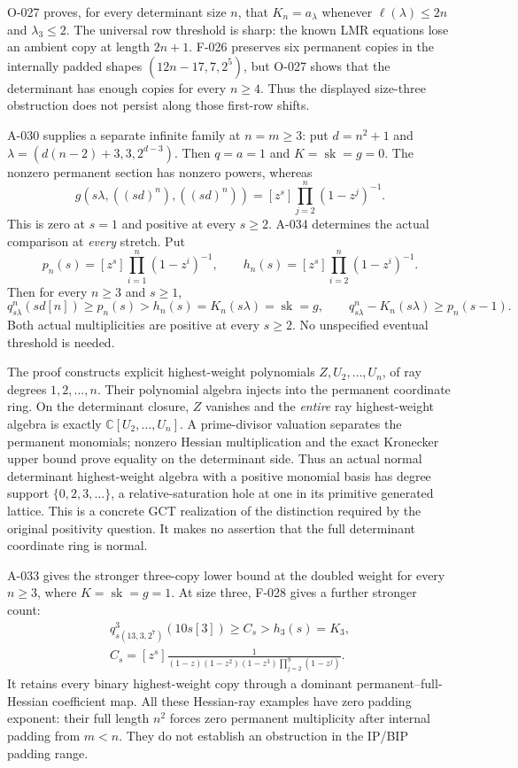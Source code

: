 \documentclass[11pt]{article}
\begin{document}
O-027 proves, for every determinant size \(n\), that
\(K_n=a_\lambda\) whenever \(\ell(\lambda)\leq2n\) and
\(\lambda_3\leq2\). The universal row threshold is sharp:
the known LMR equations lose an ambient copy at length \(2n+1\).
F-026 preserves six permanent copies in the internally padded shapes
\((12n-17,7,2^5)\), but O-027 shows that the determinant has
enough copies for every \(n\geq4\). Thus the displayed size-three
obstruction does not persist along those first-row shifts.

A-030 supplies a separate infinite family at \(n=m\geq3\): put
\(d=n^2+1\) and
\(\lambda=(d(n-2)+3,3,2^{d-3})\). Then \(q=a=1\) and
\(K=\operatorname{sk}=g=0\). The nonzero permanent section has
nonzero powers, whereas
\[
 g(s\lambda,((sd)^n),((sd)^n))
             =[z^s]\prod_{j=2}^n(1-z^j)^{-1}.
\]
This is zero at \(s=1\) and positive at every \(s\geq2\).
A-034 determines the actual comparison at \emph{every} stretch.
Put
\[
 p_n(s)=[z^s]\prod_{i=1}^n(1-z^i)^{-1},\qquad
 h_n(s)=[z^s]\prod_{i=2}^n(1-z^i)^{-1}.
\]
Then for every \(n\geq3\) and \(s\geq1\),
\[
 q^n_{s\lambda}(sd[n])\geq p_n(s)>h_n(s)
                 =K_n(s\lambda)=\operatorname{sk}=g,
 \qquad q^n_{s\lambda}-K_n(s\lambda)\geq p_n(s-1).
\]
Both actual multiplicities are positive at every \(s\geq2\).
No unspecified eventual threshold is needed.

The proof constructs explicit highest-weight polynomials
\(Z,U_2,\ldots,U_n\), of ray degrees \(1,2,\ldots,n\).
Their polynomial algebra injects into the permanent coordinate ring.
On the determinant closure, \(Z\) vanishes and the \emph{entire}
ray highest-weight algebra is exactly \(\mathbb C[U_2,\ldots,U_n]\).
A prime-divisor valuation separates the permanent monomials;
nonzero Hessian multiplication and the exact Kronecker upper bound
prove equality on the determinant side.
Thus an actual normal determinant highest-weight algebra with a
positive monomial basis has degree support
\(\{0,2,3,\ldots\}\), a relative-saturation hole at one in its
primitive generated lattice. This is a concrete GCT realization
of the distinction required by the original positivity question.
It makes no assertion that the full determinant coordinate ring is normal.

A-033 gives the stronger three-copy lower bound at the doubled
weight for every \(n\geq3\), where \(K=\operatorname{sk}=g=1\).
At size three, F-028 gives a further stronger count:
\[
 \begin{gathered}
 q^3_{s(13,3,2^7)}(10s[3])\geq C_s>h_3(s)=K_3,\\
 C_s=[z^s]\frac{1}
 {(1-z)(1-z^2)(1-z^3)\prod_{j=2}^{9}(1-z^j)}.
 \end{gathered}
\]
It retains every binary highest-weight copy through a dominant
permanent--full-Hessian coefficient map. All these Hessian-ray
examples have zero padding exponent: their full length \(n^2\)
forces zero permanent multiplicity after internal padding from \(m<n\).
They do not establish an obstruction in the IP/BIP padding range.
\end{document}
